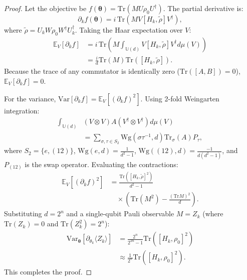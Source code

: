 \documentclass[journal]{IEEEtran}
\begin{document}
\begin{proof}
Let the objective be $f(\boldsymbol{\theta}) = \mathrm{Tr}(M U \rho_0 U^\dagger)$. The partial derivative is:
\begin{equation}
\partial_k f(\boldsymbol{\theta}) = i \, \mathrm{Tr}\left( M V [H_k, \tilde{\rho}] V^\dagger \right),
\end{equation}
where $\tilde{\rho} = U_k W \rho_0 W^\dagger U_k^\dagger$. Taking the Haar expectation over $V$:
\begin{align}
\mathbb{E}_V [\partial_k f] &= i \, \mathrm{Tr}\left( M \int_{\mathbb{U}(d)} V [H_k, \tilde{\rho}] V^\dagger d\mu(V) \right) \nonumber \\
&= \frac{i}{d} \mathrm{Tr}(M) \mathrm{Tr}([H_k, \tilde{\rho}]).
\label{eq:haar_expectation_zero}
\end{align}
Because the trace of any commutator is identically zero ($\mathrm{Tr}([A, B]) = 0$), $\mathbb{E}_V [\partial_k f] = 0$.

For the variance, $\mathrm{Var}[\partial_k f] = \mathbb{E}_V [(\partial_k f)^2]$. Using 2-fold Weingarten integration:
\begin{align}
\int_{\mathbb{U}(d)} &(V \otimes V) A (V^\dagger \otimes V^\dagger) d\mu(V) \nonumber \\
&= \sum_{\sigma, \tau \in S_2} \mathrm{Wg}(\sigma\tau^{-1}, d) \mathrm{Tr}_\sigma(A) P_\tau,
\label{eq:weingarten_formula}
\end{align}
where $S_2 = \{e, (12)\}$, $\mathrm{Wg}(e, d) = \frac{1}{d^2 - 1}$, $\mathrm{Wg}((12), d) = \frac{-1}{d(d^2 - 1)}$, and $P_{(12)}$ is the swap operator. Evaluating the contractions:
\begin{align}
\mathbb{E}_V [(\partial_k f)^2] &= \frac{\mathrm{Tr}\left([H_k, \tilde{\rho}]^2\right)}{d^2 - 1} \nonumber \\
&\quad \times \left( \mathrm{Tr}(M^2) - \frac{(\mathrm{Tr} M)^2}{d} \right).
\end{align}
Substituting $d = 2^n$ and a single-qubit Pauli observable $M = Z_k$ (where $\mathrm{Tr}(Z_k) = 0$ and $\mathrm{Tr}(Z_k^2) = 2^n$):
\begin{align}
\mathrm{Var}_{\boldsymbol{\theta}}\left[ \partial_{\theta_k} \langle Z_k \rangle \right] &= \frac{2^n}{2^{2n} - 1} \mathrm{Tr}([H_k, \rho_0]^2) \nonumber \\
&\approx \frac{1}{2^n} \mathrm{Tr}([H_k, \rho_0]^2).
\label{eq:variance_decay_proof}
\end{align}
This completes the proof.
\end{proof}
\end{document}
